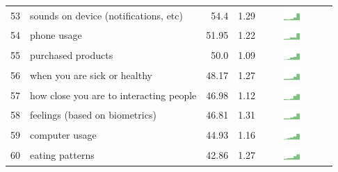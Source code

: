 \begin{table}[t]
\begin{center}
\begin{tabular}{| r | l | r | r | r | r |}
53 & sounds on device (notifications, etc) & 54.4 & 1.29 &  \includegraphics[width = 2cm, height = 0.5cm]{tex-inputs/table-images/copiedanduploadedsoundssavedonyourdevice(notificationnoisesetc)combined} \\ 
54 & phone usage & 51.95 &1.22 &  \includegraphics[width = 2cm, height = 0.5cm]{tex-inputs/table-images/learnedhowmuchyouuseyourphonecombined} \\ 
55 & purchased products & 50.0 & 1.09 & \includegraphics[width = 2cm, height = 0.5cm]{tex-inputs/table-images/learnedwhatproductsyoubuycombined} \\ 
56 & when you are sick or healthy & 48.17  & 1.27 & \includegraphics[width = 2cm, height = 0.5cm]{tex-inputs/table-images/learnedwhenyouaresickorhealthycombined} \\ 
57 & how close you are to interacting people & 46.98 & 1.12 & \includegraphics[width = 2cm, height = 0.5cm]{tex-inputs/table-images/learnedhowcloseyouaretootherpeopleyouinteractwithcombined} \\ 
58 & feelings (based on biometrics) & 46.81 & 1.31 & \includegraphics[width = 2cm, height = 0.5cm]{tex-inputs/table-images/learnedhowyouwerefeelingbasedonheartratebreathingandortemperaturecombined} \\ 
59 & computer usage & 44.93 & 1.16 & \includegraphics[width = 2cm, height = 0.5cm]{tex-inputs/table-images/learnedhowmuchyouuseyourcomputercombined} \\ 
60 & eating patterns & 42.86 & 1.27 & \includegraphics[width = 2cm, height = 0.5cm]{tex-inputs/table-images/learnedwhenhowmuchandwhatyouareeatingcombined} \\ 

\end{tabular}
\end{center}
\end{table}
